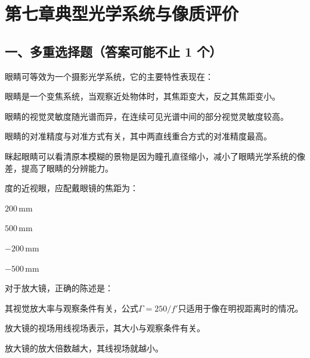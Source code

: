 \documentclass[standard, analysis, notocnum]{ExBook}
\newcommand{\answerarea}[1][8cm]{%
  \par\vspace{2mm}%
  \noindent{\color{themeColor!35}\rule{\linewidth}{0.4pt}}\par
  \noindent\begin{minipage}[t][#1][t]{\linewidth}\vspace{0pt}\end{minipage}\par
  \noindent{\color{themeColor!35}\rule{\linewidth}{0.4pt}}\par
}
\begin{document}
\section{第七章\quad 典型光学系统与像质评价}
\subsection{一、多重选择题（答案可能不止 1 个）}
\begin{qitems}
\begin{bbox}
\qitem 眼睛可等效为一个摄影光学系统，它的主要特性表现在：
\par\noindent\hspace{2em}眼睛是一个变焦系统，当观察近处物体时，其焦距变大，反之其焦距变小。
\par\noindent\hspace{2em}眼睛的视觉灵敏度随光谱而异，在连续可见光谱中间的部分视觉灵敏度较高。
\par\noindent\hspace{2em}眼睛的对准精度与对准方式有关，其中两直线重合方式的对准精度最高。
\par\noindent\hspace{2em}眯起眼睛可以看清原本模糊的景物是因为瞳孔直径缩小，减小了眼睛光学系统的像差，提高了眼睛的分辨能力。
\answerarea[3.5cm]
\end{bbox}
\begin{bbox}
 度的近视眼，应配戴眼镜的焦距为：
\par\noindent\hspace{2em}$200\,\mathrm{mm}$
\par\noindent\hspace{2em}$500\,\mathrm{mm}$
\par\noindent\hspace{2em}$-200\,\mathrm{mm}$
\par\noindent\hspace{2em}$-500\,\mathrm{mm}$
\answerarea[3.5cm]
\end{bbox}
\begin{bbox}
\qitem 对于放大镜，正确的陈述是：
\par\noindent\hspace{2em}其视觉放大率与观察条件有关，公式$\Gamma =250/f'$只适用于像在明视距离时的情况。
\par\noindent\hspace{2em}放大镜的视场用线视场表示，其大小与观察条件有关。
\par\noindent\hspace{2em}放大镜的放大倍数越大，其线视场就越小。

\end{bbox}
\end{qitems}
\end{document}

